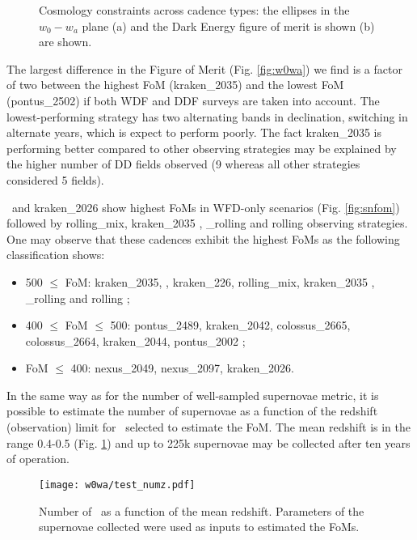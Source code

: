 \begin{figure}[!htbp]
  \begin{center}
    \caption{Cosmology constraints across cadence types: the ellipses in the $w_0-w_a$ plane (a) and the Dark Energy figure of merit is shown (b) are shown. }
    \end{center}
\end{figure}
The largest difference in the Figure of Merit (Fig. \ref{fig:w0wa}) we find is a factor of two between the highest FoM (kraken\_2035) and the lowest FoM (pontus\_2502) if both WDF and DDF surveys are taken into account. The lowest-performing strategy has two alternating bands in declination, switching in alternate years, which is expect to perform poorly. The fact kraken\_2035 is performing better compared to other observing strategies may be explained by the higher number of DD fields observed (9 whereas all other strategies considered 5 fields).

\altsched~and kraken\_2026 show highest FoMs in WFD-only scenarios (Fig. \ref{fig:snfom}) followed by rolling\_mix, kraken\_2035 , \altsched\_rolling and rolling observing strategies. One may observe that these cadences exhibit the highest FoMs as the following classification shows:
\begin{itemize}
\item{500 $\leq$ FoM}: kraken\_2035, \altsched, kraken\_226, rolling\_mix, kraken\_2035 , \altsched\_rolling and rolling ;
\item{400 $\leq$ FoM $\leq$ 500}: pontus\_2489, kraken\_2042, colossus\_2665, colossus\_2664, kraken\_2044, pontus\_2002 ;
\item{FoM $\leq$ 400}: nexus\_2049, nexus\_2097, kraken\_2026.
\end{itemize}

In the same way as for the number of well-sampled supernovae metric, it is possible to estimate the number of supernovae as a function of the  redshift (observation) limit for \sne~selected to estimate the FoM. The mean redshift is in the range 0.4-0.5 (Fig. \ref{fig:w0wazlim}) and up to 225k supernovae may be collected after ten years of operation.

\begin{figure}[!htbp]
  \begin{center}
    \texttt{[image: w0wa/test\_numz.pdf]}
    \caption{Number of \sne~as a function of the mean redshift. Parameters of the supernovae collected were used as inputs to estimated the FoMs.}
    \label{fig:w0wazlim}
  \end{center}
\end{figure}


